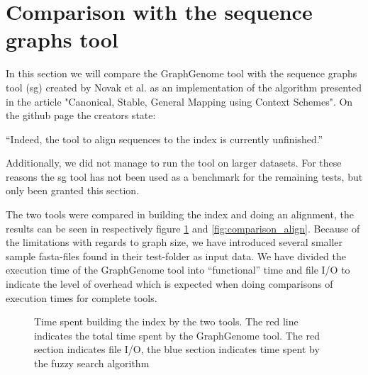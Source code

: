 \documentclass[thesis.tex]{subfiles}
\begin{document}
\section{Comparison with the sequence graphs tool}
In this section we will compare the GraphGenome tool with the sequence graphs tool (sg) created by Novak et al. as an implementation of the algorithm presented in the article "Canonical, Stable, General Mapping using Context Schemes". On the github page \cite{sg_git} the creators state:
\begin{displayquote}
``Indeed, the tool to align sequences to the index is currently unfinished.''
\end{displayquote}
Additionally, we did not manage to run the tool on larger datasets. For these reasons the sg tool has not been used as a benchmark for the remaining tests, but only been granted this section.\\
\par\noindent
 The two tools were compared in building the index and doing an alignment, the results can be seen in respectively figure \ref{fig:comparison_build} and \ref{fig:comparison_align}. Because of the limitations with regards to graph size, we have introduced several smaller sample fasta-files found in their test-folder as input data. We have divided the execution time of the GraphGenome tool into ``functional'' time and file I/O to indicate the level of overhead which is expected when doing comparisons of execution times for complete tools.
\label{sec:comparison_tools}
\begin{figure}[!hb]
  \caption[Time spent building the index by the two tools]{Time spent building the index by the two tools. The red line indicates the total time spent by the GraphGenome tool. The red section indicates file I/O, the blue section indicates time spent by the fuzzy search algorithm}
  \label{fig:comparison_build}
\end{figure}
\end{document}
